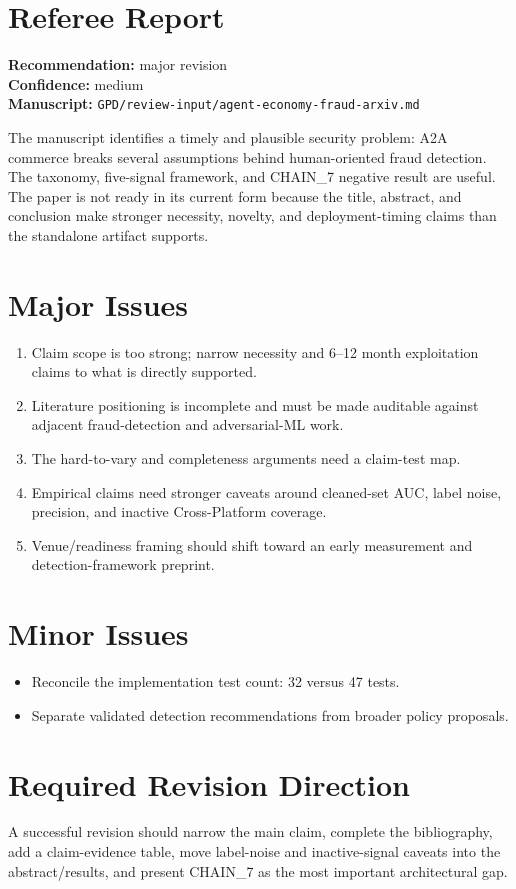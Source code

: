 \documentclass[11pt]{article}
\begin{document}
\section*{Referee Report}
\textbf{Recommendation:} major revision\\
\textbf{Confidence:} medium\\
\textbf{Manuscript:} \texttt{GPD/review-input/agent-economy-fraud-arxiv.md}

The manuscript identifies a timely and plausible security problem: A2A commerce breaks several assumptions behind human-oriented fraud detection. The taxonomy, five-signal framework, and CHAIN\_7 negative result are useful. The paper is not ready in its current form because the title, abstract, and conclusion make stronger necessity, novelty, and deployment-timing claims than the standalone artifact supports.

\section*{Major Issues}
\begin{enumerate}[leftmargin=*]
\item Claim scope is too strong; narrow necessity and 6--12 month exploitation claims to what is directly supported.
\item Literature positioning is incomplete and must be made auditable against adjacent fraud-detection and adversarial-ML work.
\item The hard-to-vary and completeness arguments need a claim-test map.
\item Empirical claims need stronger caveats around cleaned-set AUC, label noise, precision, and inactive Cross-Platform coverage.
\item Venue/readiness framing should shift toward an early measurement and detection-framework preprint.
\end{enumerate}

\section*{Minor Issues}
\begin{itemize}[leftmargin=*]
\item Reconcile the implementation test count: 32 versus 47 tests.
\item Separate validated detection recommendations from broader policy proposals.
\end{itemize}

\section*{Required Revision Direction}
A successful revision should narrow the main claim, complete the bibliography, add a claim-evidence table, move label-noise and inactive-signal caveats into the abstract/results, and present CHAIN\_7 as the most important architectural gap.
\end{document}
